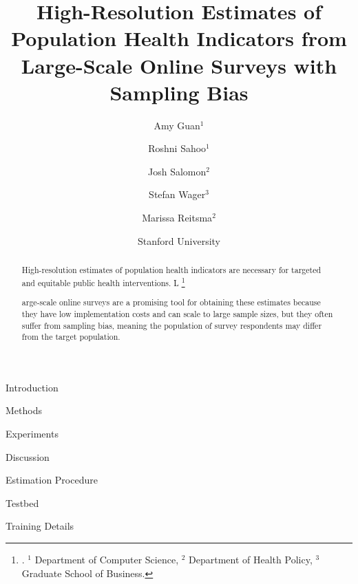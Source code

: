 \documentclass{article}
\author{
  Amy Guan$^{1}$ \and
  Roshni Sahoo$^{1}$ \and 
  Josh Salomon$^{2}$ \and
  Stefan Wager$^{3}$ \and
  Marissa Reitsma$^{2}$
}
\date{Stanford University}
\title{High-Resolution Estimates of
Population Health Indicators from Large-Scale Online
Surveys with Sampling Bias}
\theoremstyle{plain}
\theoremstyle{definition}
\theoremstyle{remark}
\newcommand\blfootnote[1]{%
  \begingroup
  \renewcommand\thefootnote{}\footnote{#1}%
  \addtocounter{footnote}{-1}%
  \endgroup
}
\begin{document}
\maketitle

\begin{abstract}
High-resolution estimates of population health indicators are necessary for targeted and equitable public health interventions. 
 L\blfootnote{\hspace{-5.3mm}{Draft version: \ifcase\month\or January\or February\or March\or April\or May\or June\or July\or August\or September\or October\or November\or December\fi \ \number \year }. $^{1}$ Department of Computer Science, $^{2}$ Department of Health Policy, $^{3}$ Graduate School of Business.}arge-scale online surveys are a promising tool for obtaining these estimates because they have low implementation costs and can scale to large sample sizes, but they often suffer from sampling bias, meaning the population of survey respondents may differ from the target population.
\end{abstract}

\begin{section}{Introduction}

\end{section}

\begin{section}{Methods}
\label{sec:method}


\end{section}

\begin{section}{Experiments}


\end{section}

\begin{section}{Discussion}


\end{section}


 


\appendix

\begin{section}{Estimation Procedure}
\label{app:alg}

\end{section}

\begin{section}{Testbed}
\label{app:dataset}


\end{section}

\begin{section}{Training Details}
\label{app:training}



\end{section}
\end{document}
